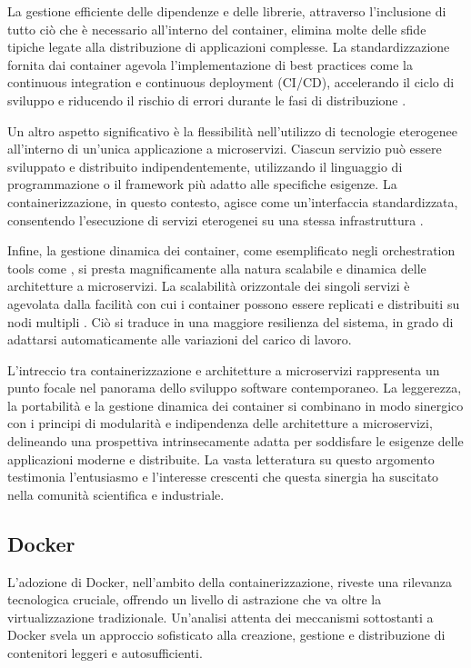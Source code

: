 La gestione efficiente delle dipendenze e delle librerie, attraverso l'inclusione di tutto ciò che è necessario all'interno del container, elimina molte delle sfide tipiche legate alla distribuzione di applicazioni complesse. La standardizzazione fornita dai container agevola l'implementazione di best practices come la continuous integration e continuous deployment (CI/CD), accelerando il ciclo di sviluppo e riducendo il rischio di errori durante le fasi di distribuzione \cite{fowler2013continuous}.

Un altro aspetto significativo è la flessibilità nell'utilizzo di tecnologie eterogenee all'interno di un'unica applicazione a microservizi. Ciascun servizio può essere sviluppato e distribuito indipendentemente, utilizzando il linguaggio di programmazione o il framework più adatto alle specifiche esigenze. La containerizzazione, in questo contesto, agisce come un'interfaccia standardizzata, consentendo l'esecuzione di servizi eterogenei su una stessa infrastruttura \cite{burns2016borg}.

Infine, la gestione dinamica dei container, come esemplificato negli orchestration tools come , si presta magnificamente alla natura scalabile e dinamica delle architetture a microservizi. La scalabilità orizzontale dei singoli servizi è agevolata dalla facilità con cui i container possono essere replicati e distribuiti su nodi multipli \cite{burns2016borg}. Ciò si traduce in una maggiore resilienza del sistema, in grado di adattarsi automaticamente alle variazioni del carico di lavoro.

L'intreccio tra containerizzazione e architetture a microservizi rappresenta un punto focale nel panorama dello sviluppo software contemporaneo. La leggerezza, la portabilità e la gestione dinamica dei container si combinano in modo sinergico con i principi di modularità e indipendenza delle architetture a microservizi, delineando una prospettiva intrinsecamente adatta per soddisfare le esigenze delle applicazioni moderne e distribuite. La vasta letteratura su questo argomento testimonia l'entusiasmo e l'interesse crescenti che questa sinergia ha suscitato nella comunità scientifica e industriale.

\subsection{Docker}

L'adozione di Docker, nell'ambito della containerizzazione, riveste una rilevanza tecnologica cruciale, offrendo un livello di astrazione che va oltre la virtualizzazione tradizionale. Un'analisi attenta dei meccanismi sottostanti a Docker svela un approccio sofisticato alla creazione, gestione e distribuzione di contenitori leggeri e autosufficienti.

